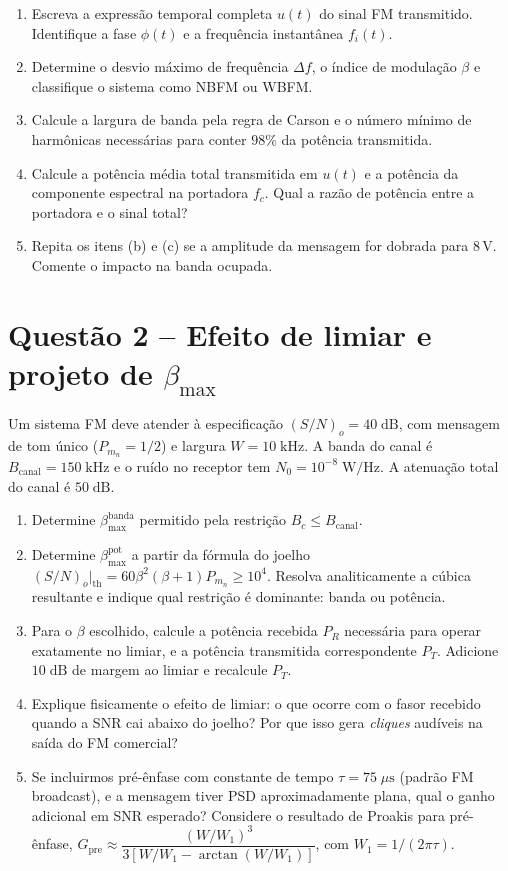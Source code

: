 \documentclass[11pt,a4paper]{article}
\begin{document}
\begin{enumerate}[label=\alph*)]
  \item Escreva a expressão temporal completa $u(t)$ do sinal FM transmitido. Identifique a fase $\phi(t)$ e a frequência instantânea $f_i(t)$.
  \item Determine o desvio máximo de frequência $\Delta f$, o índice de modulação $\beta$ e classifique o sistema como NBFM ou WBFM.
  \item Calcule a largura de banda pela regra de Carson e o número mínimo de harmônicas necessárias para conter $98\%$ da potência transmitida.
  \item Calcule a potência média total transmitida em $u(t)$ e a potência da componente espectral na portadora $f_c$. Qual a razão de potência entre a portadora e o sinal total?
  \item Repita os itens (b) e (c) se a amplitude da mensagem for dobrada para $8$\,V. Comente o impacto na banda ocupada.
\end{enumerate}

\section*{Questão 2 -- Efeito de limiar e projeto de $\beta_{\max}$}

Um sistema FM deve atender à especificação $(S/N)_o = 40\;\text{dB}$, com mensagem de tom único ($P_{m_n} = 1/2$) e largura $W = 10\;\text{kHz}$. A banda do canal é $B_{\text{canal}} = 150\;\text{kHz}$ e o ruído no receptor tem $N_0 = 10^{-8}\;\text{W/Hz}$. A atenuação total do canal é $50\;\text{dB}$.

\begin{enumerate}[label=\alph*)]
  \item Determine $\beta_{\max}^{\text{banda}}$ permitido pela restrição $B_c \le B_{\text{canal}}$.
  \item Determine $\beta_{\max}^{\text{pot}}$ a partir da fórmula do joelho $(S/N)_o\big|_{\text{th}} = 60\beta^2(\beta+1)P_{m_n} \ge 10^4$. Resolva analiticamente a cúbica resultante e indique qual restrição é dominante: banda ou potência.
  \item Para o $\beta$ escolhido, calcule a potência recebida $P_R$ necessária para operar exatamente no limiar, e a potência transmitida correspondente $P_T$. Adicione $10\;\text{dB}$ de margem ao limiar e recalcule $P_T$.
  \item Explique fisicamente o efeito de limiar: o que ocorre com o fasor recebido quando a SNR cai abaixo do joelho? Por que isso gera \emph{cliques} audíveis na saída do FM comercial?
  \item Se incluirmos pré-ênfase com constante de tempo $\tau = 75\;\mu\text{s}$ (padrão FM broadcast), e a mensagem tiver PSD aproximadamente plana, qual o ganho adicional em SNR esperado? Considere o resultado de Proakis para pré-ênfase, $G_{\text{pre}} \approx \dfrac{(W/W_1)^3}{3[W/W_1 - \arctan(W/W_1)]}$, com $W_1 = 1/(2\pi\tau)$.
\end{enumerate}
\end{document}
